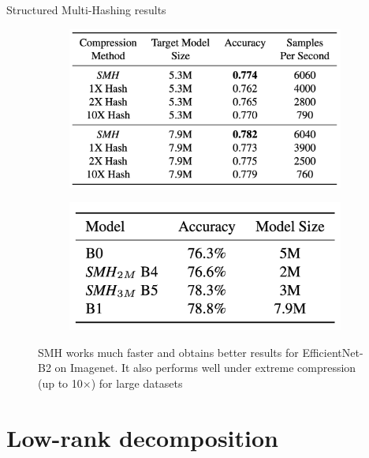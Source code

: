 \documentclass[10pt, handout]{beamer}
\begin{document}
\begin{frame}{Structured Multi-Hashing results}
\begin{figure}
\begin{subfigure}{0.47\textwidth}
    \centering
    \includegraphics[width=\linewidth]{images/smh-results.png}
\end{subfigure}
\begin{subfigure}{0.47\textwidth}
    \centering
    \includegraphics[width=\linewidth]{images/smh-results-extreme-compression.png}
\end{subfigure}
\caption{SMH works much faster and obtains better results for EfficientNet-B2 on Imagenet. It also performs well under extreme compression (up to 10$\times$) for large datasets}
\label{fig:smh-results}
\end{figure}
\end{frame}


\section{Low-rank decomposition}
\end{document}
